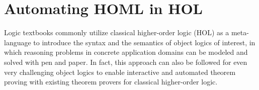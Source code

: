 \documentclass{article}
\begin{document}









\section{Automating HOML in HOL}\label{sec:homlinhol}

Logic textbooks %
commonly utilize classical higher-order logic (HOL)
\cite{Church40} as a meta-language to introduce the syntax and the
semantics of object logics of interest, in which reasoning
problems in concrete application domains can be modeled and solved
with pen and paper. In fact, this approach can also be followed for even very challenging
object logics to
enable interactive and automated theorem proving with existing theorem provers for classical
higher-order logic.

\end{document}
